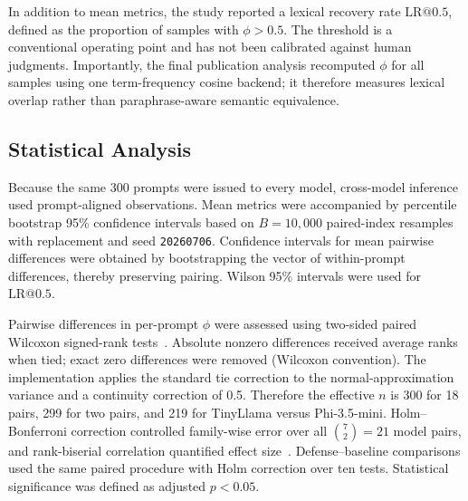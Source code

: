 \documentclass[journal,article,submit,pdftex,moreauthors]{Definitions/mdpi}
\begin{document}
In addition to mean metrics, the study reported a lexical recovery rate $\mathrm{LR}@0.5$, defined as the proportion of samples with $\phi > 0.5$. The threshold is a conventional operating point and has not been calibrated against human judgments. Importantly, the final publication analysis recomputed $\phi$ for all samples using one term-frequency cosine backend; it therefore measures lexical overlap rather than paraphrase-aware semantic equivalence.

\subsection{Statistical Analysis}
Because the same 300 prompts were issued to every model, cross-model inference used prompt-aligned observations. Mean metrics were accompanied by percentile bootstrap 95\% confidence intervals based on $B=10{,}000$ paired-index resamples with replacement and seed \texttt{20260706}. Confidence intervals for mean pairwise differences were obtained by bootstrapping the vector of within-prompt differences, thereby preserving pairing. Wilson 95\% intervals were used for $\mathrm{LR}@0.5$.

Pairwise differences in per-prompt $\phi$ were assessed using two-sided paired Wilcoxon signed-rank tests~\cite{wilcoxon1945individual}. Absolute nonzero differences received average ranks when tied; exact zero differences were removed (Wilcoxon convention). The implementation applies the standard tie correction to the normal-approximation variance and a continuity correction of 0.5. Therefore the effective $n$ is 300 for 18 pairs, 299 for two pairs, and 219 for TinyLlama versus Phi-3.5-mini. Holm--Bonferroni correction controlled family-wise error over all $\binom{7}{2}=21$ model pairs, and rank-biserial correlation quantified effect size~\cite{efron1994bootstrap,holm1979simple}. Defense--baseline comparisons used the same paired procedure with Holm correction over ten tests. Statistical significance was defined as adjusted $p<0.05$.
\end{document}
